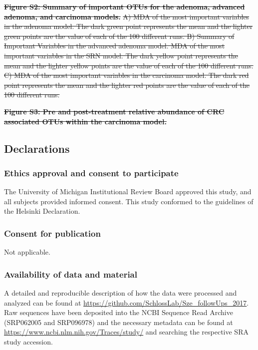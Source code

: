 \documentclass[12pt,]{article}
\providecommand{\DIFdeltex}[1]{{\protect\color{red}\sout{#1}}}                      %
\providecommand{\DIFdelend}{} %
\providecommand{\DIFdel}[1]{\texorpdfstring{\DIFdeltex{#1}}{}} %
\begin{document}
\textbf{\DIFdel{Figure S2: Summary of important OTUs for the adenoma, advanced
adenoma, and carcinoma models.}} %
\DIFdel{A) MDA of the most important variables
in the adenoma model. The dark green point represents the mean and the
lighter green points are the value of each of the 100 different runs. B)
Summary of Important Variables in the advanced adenoma model. MDA of the
most important variables in the SRN model. The dark yellow point
represents the mean and the lighter yellow points are the value of each
of the 100 different runs. C) MDA of the most important variables in the
carcinoma model. The dark red point represents the mean and the lighter
red points are the value of each of the 100 different runs.
}%

\textbf{\DIFdel{Figure S3: Pre and post-treatment relative abundance of CRC
associated OTUs within the carcinoma model.}}


\DIFdelend \subsection{Declarations}\label{declarations}

\subsubsection{Ethics approval and consent to
participate}\label{ethics-approval-and-consent-to-participate}

The University of Michigan Institutional Review Board approved this
study, and all subjects provided informed consent. This study conformed
to the guidelines of the Helsinki Declaration.

\subsubsection{Consent for publication}\label{consent-for-publication}

Not applicable.

\subsubsection{Availability of data and
material}\label{availability-of-data-and-material}

A detailed and reproducible description of how the data were processed
and analyzed can be found at
\url{https://github.com/SchlossLab/Sze_followUps_2017}. Raw sequences
have been deposited into the NCBI Sequence Read Archive (SRP062005 and
SRP096978) and the necessary metadata can be found at
\url{https://www.ncbi.nlm.nih.gov/Traces/study/} and searching the
respective SRA study accession.
\end{document}
